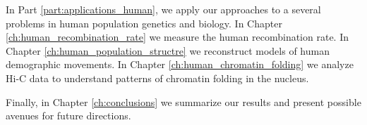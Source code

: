 In Part \ref{part:applications_human}, we apply our approaches to a several problems in human population genetics and biology.
In Chapter \ref{ch:human_recombination_rate} we measure the human recombination rate.
In Chapter \ref{ch:human_population_structre} we reconstruct models of human demographic movements.
In Chapter \ref{ch:human_chromatin_folding} we analyze Hi-C data to understand patterns of chromatin folding in the nucleus.

Finally, in Chapter \ref{ch:conclusions} we summarize our results and present possible avenues for future directions.